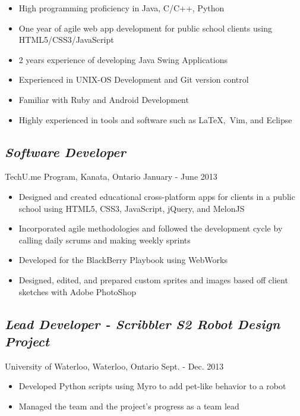 \documentclass[10pt]{article}
\begin{document}
\begin{minipage}[t]{0.83\linewidth} 
	\begin{itemize}
		\item High programming proficiency in Java, C/C++, Python
		\item One year of agile web app development for public school clients using HTML5/CSS3/JavaScript
		\item 2 years experience of developing Java Swing Applications
		\item Experienced in UNIX-OS Development and Git version control
		\item Familiar with Ruby and Android Development
		\item Highly experienced in tools and software such as \LaTeX,\ Vim, and Eclipse
	\end{itemize}

	\subsection*{\textit{Software Developer}} \vspace{-6pt} 
		TechU.me Program, Kanata, Ontario \hspace{135pt} January - June 2013
		\begin{itemize}
			\item Designed and created educational cross-platform apps for clients in a public school using HTML5, CSS3, JavaScript, jQuery, and MelonJS
			\item Incorporated agile methodologies and followed the development cycle by calling daily scrums and 						making weekly sprints
			\item Developed for the BlackBerry Playbook using WebWorks
			\item Designed, edited, and prepared custom sprites and images based off client sketches with Adobe 							PhotoShop
		\end{itemize}
		
	\subsection*{\textit{Lead Developer - Scribbler S2 Robot Design Project}} \vspace{-6pt} 
		University of Waterloo, Waterloo, Ontario \hspace{118pt} Sept. - Dec. 2013
		\begin{itemize}
			\item Developed Python scripts using Myro to add pet-like behavior to a robot 
			\item Managed the team and the project's progress as a team lead			
		\end{itemize}
		

\end{minipage}
\end{document}
